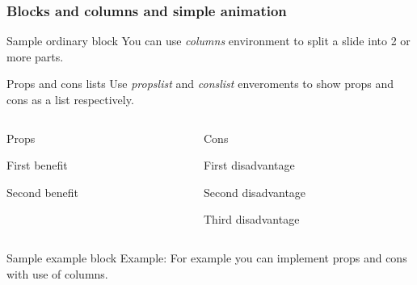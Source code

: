 \documentclass{beamer}
\begin{document}
\begin{frame}
    \frametitle{Blocks and columns and simple animation}

    \begin{block}{Sample ordinary block}
        You can use \textit{columns} environment to
        split a slide into 2 or more parts.
    \end{block}

    \begin{alertblock}{Props and cons lists}
        Use \textit{propslist} and \textit{conslist} enveroments
        to show props and cons as a list respectively.
    \end{alertblock}

    \begin{columns}[T]
        \begin{column}{.5\textwidth} \pause
            \centering Props
            \begin{propslist}
                \item First benefit \pause
                \item Second benefit \pause
            \end{propslist}
        \end{column}
        \begin{column}{.5\textwidth}
            \centering Cons %
            \begin{conslist}
                \item First disadvantage \pause
                \item Second disadvantage \pause
                \item Third disadvantage \pause
            \end{conslist}
        \end{column}
    \end{columns}

    \begin{exampleblock}{Sample example block}
        Example: For example you can implement props and cons
        with use of columns.
    \end{exampleblock}

\end{frame}
\end{document}
